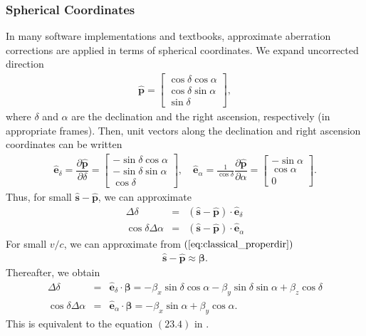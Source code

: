 \documentclass [12pt, a4paper] {article}
\newcommand{\vu}[1]
{
	\mathbf{\hat #1}
}
\newcommand{\vc}[1]
{
	\boldsymbol{#1}
}
\newcommand{\pdiff}[2]
{
	\dfrac{\partial #1}{\partial #2}
}
\begin{document}
\subsubsection{Spherical Coordinates}
In many software implementations and textbooks, approximate aberration corrections 
are applied in terms of spherical coordinates. We expand uncorrected direction 
\begin {eqnarray}
    \vu p
    = 
    \begin {bmatrix}
        \cos\delta\cos\alpha \\
        \cos\delta\sin\alpha \\
        \sin\delta
    \end {bmatrix},
\end {eqnarray}
where $\delta$ and $\alpha$ are the declination and the right ascension, 
respectively (in appropriate frames). Then, unit vectors along the 
declination and right ascension coordinates can be written 
\begin {eqnarray}
    \vu e_{\delta} =\pdiff{\vu p}{\delta}
    = 
    \begin {bmatrix}
        -\sin\delta\cos\alpha \\
        -\sin\delta\sin\alpha \\
        \cos\delta
    \end {bmatrix},
    \quad
    \vu e_{\alpha} 
    =
    \frac{1}{\cos\delta}\pdiff{\vu p}{\alpha}
    = 
    \begin {bmatrix}
        -\sin\alpha \\
        \cos\alpha \\
        0
    \end {bmatrix}.
\end {eqnarray}
Thus, for small $\vu s - \vu p$, we can approximate 
\begin {eqnarray}
    \Delta\delta &=& (\vu s - \vu p)\cdot\vu e_\delta
    \\
    \cos\delta \Delta\alpha &=& (\vu s - \vu p)\cdot\vu e_\alpha
\end {eqnarray}
For small $v/c$, we can approximate from $(\ref{eq:classical_properdir})$ 
\begin {eqnarray}
    \vu s - \vu p \approx \vc\beta.
\end {eqnarray}
Thereafter, we obtain 
\begin {eqnarray}
    \label{eq:spherical_decl}
    \Delta\delta 
    &=& 
    \vu e_\delta \cdot\vc\beta
    =
    -\beta_x\sin\delta\cos\alpha - \beta_y\sin\delta\sin\alpha + \beta_z\cos\delta
    \\
    \label{eq:spherical_ra}
    \cos\delta\Delta\alpha 
    &=& 
    \vu e_\alpha\cdot\vc\beta 
    = 
    - \beta_x\sin\alpha + \beta_y\cos\alpha.
\end {eqnarray}
This is equivalent to the equation $(23.4)$ in \cite{meeus}.
\end{document}
